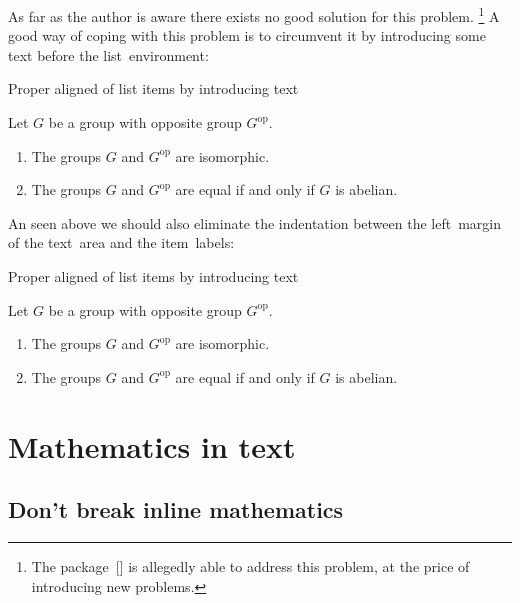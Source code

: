 As far as the author is aware there exists no good solution for this problem.%
\footnote{The package~[\packname] is allegedly able to address this problem, at the price of introducing new problems.}
A good way of coping with this problem is to circumvent it by introducing some text before the list~environment:
\begin{showlatex}{Proper aligned of list items by introducing text}
\begin{lemma}
Let $G$ be a group with opposite group $G^{\mathrm{op}}$. 
\begin{enumerate}
  \item
    The groups $G$ and $G^{\mathrm{op}}$ are isomorphic.
  \item
    The groups $G$ and $G^{\mathrm{op}}$ are equal if and only if $G$ is abelian.
\end{enumerate}
\end{lemma}
\end{showlatex}
An seen above we should also eliminate the indentation between the left~margin of the text~area and the item~labels:
\begin{showlatex}{Proper aligned of list items by introducing text}
\begin{lemma}
Let $G$ be a group with opposite group $G^{\mathrm{op}}$. 
\begin{enumerate}[wide = 0pt, leftmargin=*]
  \item
    The groups $G$ and $G^{\mathrm{op}}$ are isomorphic.
  \item
    The groups $G$ and $G^{\mathrm{op}}$ are equal if and only if $G$ is abelian.
\end{enumerate}
\end{lemma}
\end{showlatex}



\section{Mathematics in text}



\subsection{Don’t break inline mathematics}
\label{breaking inline math}

